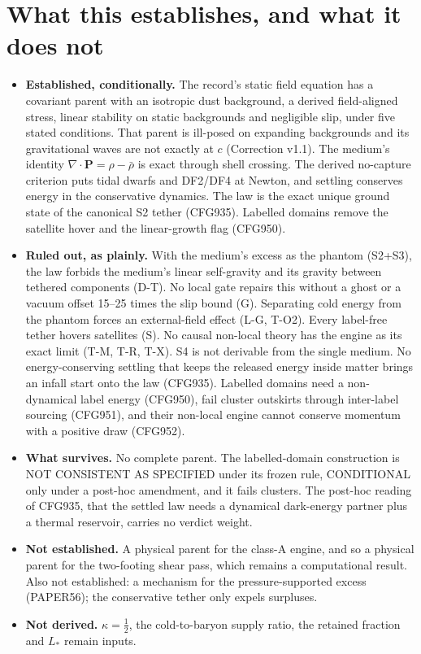 \documentclass[10pt]{article}
\begin{document}
\section{What this establishes, and what it does not}
\begin{itemize}
\item \textbf{Established, conditionally.} The record's static field equation has a covariant parent with an isotropic dust background, a derived field-aligned stress, linear stability on static backgrounds and negligible slip, under five stated conditions. That parent is ill-posed on expanding backgrounds and its gravitational waves are not exactly at $c$ (Correction v1.1). The medium's identity $\nabla\cdot\mathbf P=\rho-\bar\rho$ is exact through shell crossing. The derived no-capture criterion puts tidal dwarfs and DF2/DF4 at Newton, and settling conserves energy in the conservative dynamics. The law is the exact unique ground state of the canonical S2 tether (CFG935). Labelled domains remove the satellite hover and the linear-growth flag (CFG950).
\item \textbf{Ruled out, as plainly.} With the medium's excess as the phantom (S2+S3), the law forbids the medium's linear self-gravity and its gravity between tethered components (D-T). No local gate repairs this without a ghost or a vacuum offset 15--25 times the slip bound (G). Separating cold energy from the phantom forces an external-field effect (L-G, T-O2). Every label-free tether hovers satellites (S). No causal non-local theory has the engine as its exact limit (T-M, T-R, T-X). S4 is not derivable from the single medium. No energy-conserving settling that keeps the released energy inside matter brings an infall start onto the law (CFG935). Labelled domains need a non-dynamical label energy (CFG950), fail cluster outskirts through inter-label sourcing (CFG951), and their non-local engine cannot conserve momentum with a positive draw (CFG952).
\item \textbf{What survives.} No complete parent. The labelled-domain construction is NOT CONSISTENT AS SPECIFIED under its frozen rule, CONDITIONAL only under a post-hoc amendment, and it fails clusters. The post-hoc reading of CFG935, that the settled law needs a dynamical dark-energy partner plus a thermal reservoir, carries no verdict weight.
\item \textbf{Not established.} A physical parent for the class-A engine, and so a physical parent for the two-footing shear pass, which remains a computational result. Also not established: a mechanism for the pressure-supported excess (PAPER56); the conservative tether only expels surpluses.
\item \textbf{Not derived.} $\kappa=\tfrac12$, the cold-to-baryon supply ratio, the retained fraction and $L_*$ remain inputs.
\end{itemize}
\end{document}
